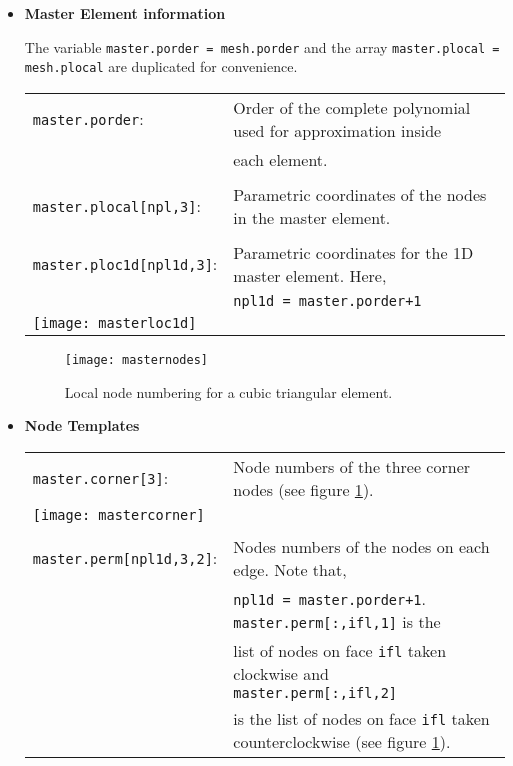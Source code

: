 \documentclass[11pt]{article}
\begin{document}
\begin{itemize}

\item {\bf Master Element information}

{The variable \texttt{master.porder = mesh.porder} and the array \texttt{master.plocal = mesh.plocal} are duplicated for convenience.}

\bigskip

\begin{tabular}{|ll}
        \texttt{master.porder}: & Order of the complete polynomial used for approximation inside \\ &  each element. \\  
            \\ 
	\texttt{master.plocal[npl,3]}: & Parametric coordinates of the nodes in the master element. \\	 \\
	
	\texttt{master.ploc1d[npl1d,3]}: & Parametric coordinates for the 1D master element. Here, \\ & \texttt{npl1d = master.porder+1} \\	 
	
     \multicolumn{2}{|l}{ \texttt{[image: masterloc1d]}} \\
\end{tabular}


 \begin{figure}[h]	
\begin{center}
	\texttt{[image: masternodes]}
	\end{center}
		\caption{Local node numbering for a cubic triangular element.  }
		\label{masternodeslab}
\end{figure}

\newpage 

\item {\bf Node Templates}

\begin{tabular}{|ll}
        \texttt{master.corner[3]}: & Node numbers of the three corner nodes (see figure \ref{masternodeslab}). \\  
             \multicolumn{2}{|l}{ \texttt{[image: mastercorner]}} \\
            \\ 
		\texttt{master.perm[npl1d,3,2]}: & Nodes numbers of the nodes on each edge. Note that, \\ &  \texttt{npl1d = master.porder+1}. 
		\texttt{master.perm[:,ifl,1]} is the \\  & list of nodes on face \texttt{ifl} taken clockwise and \texttt{master.perm[:,ifl,2]} \\ & is the list of
		 nodes on face \texttt{ifl} taken counterclockwise (see figure \ref{masternodeslab}).  \\
			 

\end{tabular}
\end{itemize}
\end{document}
